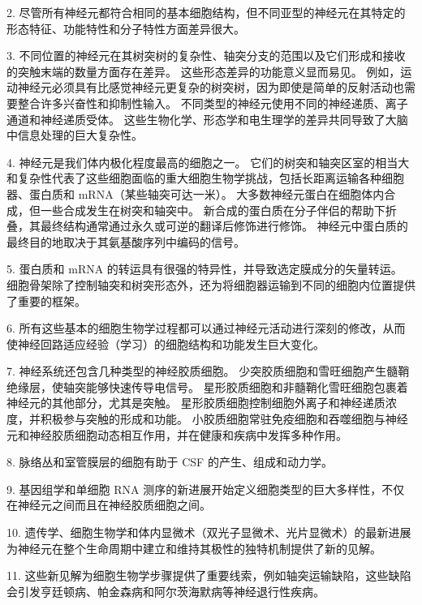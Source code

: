 2. 尽管所有神经元都符合相同的基本细胞结构，但不同亚型的神经元在其特定的形态特征、功能特性和分子特性方面差异很大。 


3. 不同位置的神经元在其树突树的复杂性、轴突分支的范围以及它们形成和接收的突触末端的数量方面存在差异。 
这些形态差异的功能意义显而易见。 
例如，运动神经元必须具有比感觉神经元更复杂的树突树，因为即使是简单的反射活动也需要整合许多兴奋性和抑制性输入。 
不同类型的神经元使用不同的神经递质、离子通道和神经递质受体。 
这些生物化学、形态学和电生理学的差异共同导致了大脑中信息处理的巨大复杂性。 


4. 神经元是我们体内极化程度最高的细胞之一。 
它们的树突和轴突区室的相当大和复杂性代表了这些细胞面临的重大细胞生物学挑战，包括长距离运输各种细胞器、蛋白质和 mRNA（某些轴突可达一米）。 
大多数神经元蛋白在细胞体内合成，但一些合成发生在树突和轴突中。 
新合成的蛋白质在分子伴侣的帮助下折叠，其最终结构通常通过永久或可逆的翻译后修饰进行修饰。 
神经元中蛋白质的最终目的地取决于其氨基酸序列中编码的信号。 


5. 蛋白质和 mRNA 的转运具有很强的特异性，并导致选定膜成分的矢量转运。 
细胞骨架除了控制轴突和树突形态外，还为将细胞器运输到不同的细胞内位置提供了重要的框架。 


6. 所有这些基本的细胞生物学过程都可以通过神经元活动进行深刻的修改，从而使神经回路适应经验（学习）的细胞结构和功能发生巨大变化。 


7. 神经系统还包含几种类型的神经胶质细胞。 
少突胶质细胞和雪旺细胞产生髓鞘绝缘层，使轴突能够快速传导电信号。 
星形胶质细胞和非髓鞘化雪旺细胞包裹着神经元的其他部分，尤其是突触。 
星形胶质细胞控制细胞外离子和神经递质浓度，并积极参与突触的形成和功能。 
小胶质细胞常驻免疫细胞和吞噬细胞与神经元和神经胶质细胞动态相互作用，并在健康和疾病中发挥多种作用。 


8. 脉络丛和室管膜层的细胞有助于 CSF 的产生、组成和动力学。 


9. 基因组学和单细胞 RNA 测序的新进展开始定义细胞类型的巨大多样性，不仅在神经元之间而且在神经胶质细胞之间。 


10. 遗传学、细胞生物学和体内显微术（双光子显微术、光片显微术）的最新进展为神经元在整个生命周期中建立和维持其极性的独特机制提供了新的见解。 


11. 这些新见解为细胞生物学步骤提供了重要线索，例如轴突运输缺陷，这些缺陷会引发亨廷顿病、帕金森病和阿尔茨海默病等神经退行性疾病。


%
